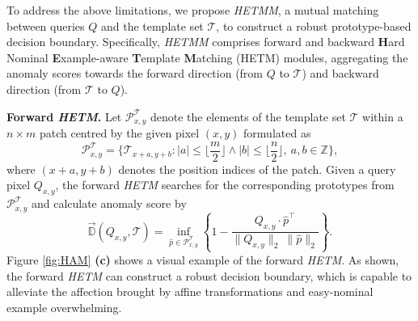 \documentclass[default,iicol]{sn-jnl}\usepackage[algo2e,ruled,linesnumbered]{algorithm2e}
\theoremstyle{thmstyleone}\newtheorem{theorem}{Theorem}\newtheorem{proposition}[theorem]{Proposition}
\theoremstyle{thmstyletwo}\newtheorem{example}{Example}\newtheorem{remark}{Remark}
\theoremstyle{thmstylethree}\newtheorem{definition}{Definition}
\begin{document}
To address the above limitations, we propose \textit{HETMM}, a mutual matching between queries $Q$ and the template set $\mathcal{T}$, to construct a robust prototype-based decision boundary.
Specifically, \textit{HETMM} comprises forward and backward \textbf{H}ard Nominal \textbf{E}xample-aware \textbf{T}emplate \textbf{M}atching (HETM) modules, aggregating the anomaly scores towards the forward direction (from $Q$ to $\mathcal{T}$) and backward direction (from $\mathcal{T}$ to $Q$).

\noindent\textbf{Forward \textit{HETM}. }
Let $\mathcal{P}^{\mathcal{T}}_{x,y}$ denote the elements of the template set $\mathcal{T}$ within a $n\!\times\!m$ patch centred by the given pixel $(x,y)$ formulated as
\begin{equation}
    \mathcal{P}^{\mathcal{T}}_{x,y} \!\!=\!\! \{\mathcal{T}_{x+a, y+b}\!\!:\!\lvert a \rvert\!\le\!\lfloor\!\frac{m}{2}\!\rfloor\!\land\! \lvert b\rvert\!\le\!\lfloor\!\frac{n}{2}\!\rfloor,\ \!a,\!b\in\mathbb{Z}\},
    \label{eq:PT}
\end{equation}
where $(x+a, y+b)$ denotes the position indices of the patch.
Given a query pixel $Q_{x,y}$, the forward \textit{HETM} searches for the corresponding prototypes from $\mathcal{P}^{\mathcal{T}}_{x,y}$ and calculate anomaly score by
\begin{equation}
    \overset{\to}{\mathbb{D}}(Q_{x,y}, \mathcal{T}) = \inf\limits_{\hat{p}\in\mathcal{P}^{\mathcal{T}}_{x,y}}\left\{1-\frac{Q_{x, y}\cdot\hat{p}^{\top}}{\|Q_{x, y}\|_{2}\ \|\hat{p}\|_{2}}\right\}.
    \label{eq:DQT}
\end{equation}
Figure \ref{fig:HAM} \textbf{(c)} shows a visual example of the forward \textit{HETM}.
As shown, the forward \textit{HETM} can construct a robust decision boundary, which is capable to alleviate the affection brought by affine transformations and easy-nominal example overwhelming.
\end{document}
